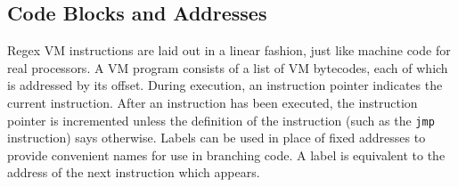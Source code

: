 \subsection{Code Blocks and Addresses}

Regex VM instructions are laid out in a linear fashion, just like
machine code for real processors. A VM program consists of a list of
VM bytecodes, each of which is addressed by its offset. During
execution, an instruction pointer indicates the current instruction.
After an instruction has been executed, the instruction pointer
is incremented unless the definition of the instruction (such as
the \verb'jmp' instruction) says otherwise. Labels can be used
in place of fixed addresses to provide convenient names for
use in branching code. A label is equivalent to the address
of the next instruction which appears.


